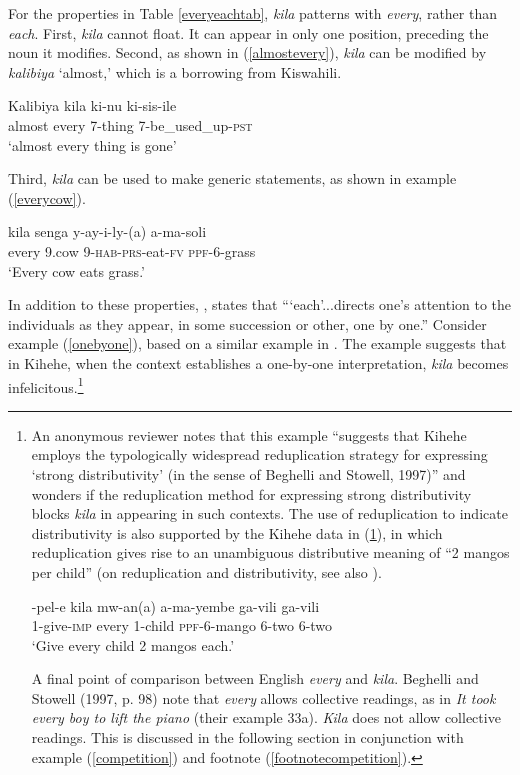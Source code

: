 \documentclass[letterpaper, 12pt]{article}
\begin{document}
For the properties in Table \ref{everyeachtab}, \textit{kila} patterns with \textit{every}, rather than \textit{each}.  First, \textit{kila} cannot float. It can appear in only one position, preceding the noun it modifies. Second, as shown in (\ref{almostevery}), \textit{kila} can be modified by \textit{kalibiya} `almost,' which is a borrowing from Kiswahili. 

\begin{exe}
\ex \gll Kalibiya kila ki-nu ki-sis-ile     \\
almost every 7-thing 7-be\_used_up-\textsc{pst} \\
`almost every thing is gone' \\ \label{almostevery}
\end{exe}

Third, \emph{kila} can be used to make generic statements, as shown in example (\ref{everycow}).

\begin{exe}
\singlespacing

\ex \gll kila senga y-ay-i-ly-(a) a-ma-soli \label{everycow}\\
every 9.cow 9-\textsc{hab}-\textsc{prs}-eat-\textsc{fv} \textsc{ppf}-6-grass \\
`Every cow eats grass.' 

\end{exe}


In addition to these properties, , states that ```each'...directs one's attention to the individuals as they appear, in some succession or other, one by one.''  Consider example (\ref{onebyone}), based on a similar example in . The example suggests that in Kihehe, when the context establishes a one-by-one interpretation, \textit{kila} becomes infelicitous.\footnote{An anonymous reviewer notes that this example ``suggests that Kihehe employs the typologically widespread reduplication strategy for expressing `strong distributivity' (in the sense of Beghelli and Stowell, 1997)'' and wonders if the reduplication method for expressing strong distributivity blocks \textit{kila} in appearing in such contexts. The use of reduplication to indicate distributivity is also supported by the Kihehe data in (\ref{mangos}), in which reduplication gives rise to an unambiguous distributive meaning of ``2 mangos per child'' (on reduplication and distributivity, see also ). 
\begin{exe}
\ex \label{mangos} \gll {}-pel-e kila mw-an(a) a-ma-yembe ga-vili ga-vili \\
1-give-\textsc{imp} every 1-child \textsc{ppf}-6-mango 6-two 6-two \\
`Give every child 2 mangos each.' \\
\end{exe}

A final point of comparison between English \textit{every} and \textit{kila}. Beghelli and Stowell (1997, p. 98) note that \textit{every} allows collective readings, as in \textit{It took every boy to lift the piano} (their example 33a). \textit{Kila} does not allow collective readings. This is discussed in the following section in conjunction with example (\ref{competition}) and footnote (\ref{footnotecompetition}).}
\end{document}
